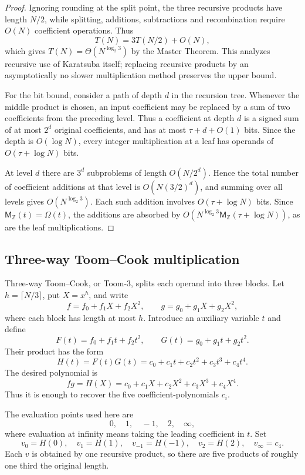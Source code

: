 \documentclass[11pt]{book}
\theoremstyle{definition}
\newcommand{\ZZ}{\mathbb Z}
\newcommand{\MZ}{\mathsf M_{\ZZ}}
\begin{document}
\begin{proof}
Ignoring rounding at the split point, the three recursive products have length
$N/2$, while splitting, additions, subtractions and recombination require
$O(N)$ coefficient operations.  Thus
\[
 T(N)=3T(N/2)+O(N),
\]
which gives $T(N)=\Theta(N^{\log_2 3})$ by the Master Theorem.  This
analyzes recursive use of Karatsuba itself; replacing recursive products by an
asymptotically no slower multiplication method preserves the upper bound.

For the bit bound, consider a path of depth $d$ in the recursion tree.
Whenever the middle product is chosen, an input coefficient may be replaced by
a sum of two coefficients from the preceding level.  Thus a coefficient at
depth $d$ is a signed sum of at most $2^d$ original coefficients, and has at
most $\tau+d+O(1)$ bits.  Since the depth is $O(\log N)$, every integer
multiplication at a leaf has operands of $O(\tau+\log N)$ bits.

At level $d$ there are $3^d$ subproblems of length $O(N/2^d)$.  Hence the
total number of coefficient additions at that level is
$O(N(3/2)^d)$, and summing over all levels gives
$O(N^{\log_2 3})$.  Each such addition involves
$O(\tau+\log N)$ bits.  Since $\MZ(t)=\Omega(t)$, the additions are absorbed by
$O(N^{\log_2 3}\MZ(\tau+\log N))$, as are the leaf multiplications.
\end{proof}

\subsection{Three-way Toom--Cook multiplication}

Three-way Toom--Cook, or Toom-3, splits each operand into three blocks.  Let
$h=\lceil N/3\rceil$, put $X=x^h$, and write
\[
 f=f_0+f_1X+f_2X^2,
 \qquad
 g=g_0+g_1X+g_2X^2,
\]
where each block has length at most $h$.  Introduce an auxiliary variable $t$
and define
\[
 F(t)=f_0+f_1t+f_2t^2,
 \qquad
 G(t)=g_0+g_1t+g_2t^2.
\]
Their product has the form
\[
 H(t)=F(t)G(t)=c_0+c_1t+c_2t^2+c_3t^3+c_4t^4.
\]
The desired polynomial is
\begin{equation}\label{eq:toom-recompose}
 fg=H(X)=c_0+c_1X+c_2X^2+c_3X^3+c_4X^4.
\end{equation}
Thus it is enough to recover the five coefficient-polynomials $c_i$.

The evaluation points used here are
\[
 0,\quad 1,\quad -1,\quad 2,\quad \infty,
\]
where evaluation at infinity means taking the leading coefficient in $t$.
Set
\[
 v_0=H(0),\quad v_1=H(1),\quad v_{-1}=H(-1),
 \quad v_2=H(2),\quad v_\infty=c_4.
\]
Each $v$ is obtained by one recursive product, so there are five products of
roughly one third the original length.
\end{document}
